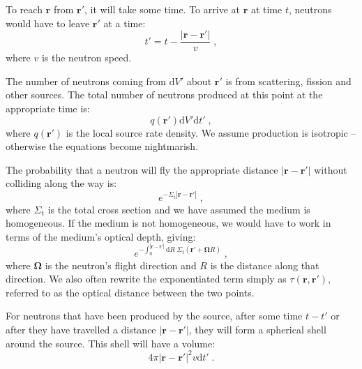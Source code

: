 To reach $\mathbf{r}$ from $\mathbf{r}'$, it will take some time. To arrive at $\mathbf{r}$ at time $t$, neutrons would have to leave $\mathbf{r}'$ at a time:
\begin{equation*}
    t' = t - \frac{|\mathbf{r}-\mathbf{r}'|}{v}\;\mathrm{,}
\end{equation*}
where $v$ is the neutron speed.

The number of neutrons coming from $\mathrm{d}V'$ about $\mathbf{r}'$ is from scattering, fission and other sources. The total number of neutrons produced at this point at the appropriate time is:
\begin{equation*}
    q(\mathbf{r}')\mathrm{d}V'\mathrm{d}t'\;\mathrm{,}
\end{equation*}
where $q(\mathbf{r}')$ is the local source rate density. We assume production is isotropic -- otherwise the equations become nightmarish.

The probability that a neutron will fly the appropriate distance $|\mathbf{r}-\mathbf{r}'|$ without colliding along the way is:
\begin{equation*}
    e^{-\Sigma_\mathrm{t}|\mathbf{r}-\mathbf{r}'|}\;\mathrm{,}
\end{equation*}
where $\Sigma_\mathrm{t}$ is the total cross section and we have assumed the medium is homogeneous. If the medium is not homogeneous, we would have to work in terms of the medium's optical depth, giving:
\begin{equation*}
    e^{-\int^{|\mathbf{r}-\mathbf{r}'|}_0\mathrm{d}R\;\Sigma_\mathrm{t}(\mathbf{r'}+\mathbf{\Omega}R)}\;\mathrm{,}
\end{equation*}
where $\mathbf{\Omega}$ is the neutron's flight direction and $R$ is the distance along that direction. We also often rewrite the exponentiated term simply as $\tau(\mathbf{r},\mathbf{r}')$, referred to as the optical distance between the two points.

For neutrons that have been produced by the source, after some time $t - t'$ or after they have travelled a distance $|\mathbf{r}-\mathbf{r}'|$, they will form a spherical shell around the source. This shell will have a volume:
\begin{equation*}
    4\pi|\mathbf{r}-\mathbf{r}'|^2 v\mathrm{d}t'\;\mathrm{.}
\end{equation*}

